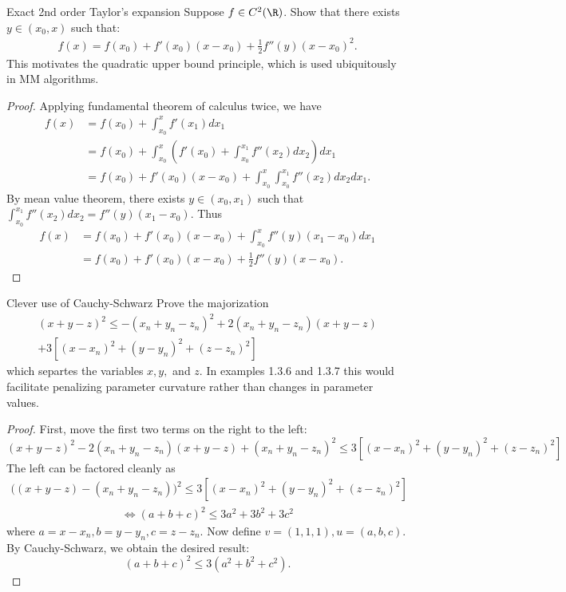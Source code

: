 \begin{problembox}{Exact 2nd order Taylor's expansion}{}
Suppose $f \in C^{2}(\R)$. Show that there exists $y \in (x_0, x)$ such that:
\begin{align*}
f(x) = f(x_0) + f'(x_0)(x - x_0) + \frac{1}{2} f''(y)(x - x_0)^2.
\end{align*}
This motivates the quadratic upper bound principle, which is used ubiquitously in MM algorithms.
\end{problembox}

\begin{proof}
Applying fundamental theorem of calculus twice, we have
\begin{align*}
	f(x) 
	&= f(x_0) + \int_{x_0}^x f'(x_1) dx_1\\
	&=f(x_0) + \int_{x_0}^x \left(f'(x_0) + \int_{x_0}^{x_1} f''(x_2)dx_2 \right)dx_1\\
	&= f(x_0) + f'(x_0)(x - x_0) + \int_{x_0}^x\int_{x_0}^{x_1}f''(x_2)dx_2dx_1.
\end{align*}
By mean value theorem, there exists $y \in (x_0, x_1)$ such that $\int_{x_0}^{x_1}f''(x_2)dx_2 = f''(y)(x_1 - x_0).$ Thus
\begin{align*}
	f(x)
	&= f(x_0) + f'(x_0)(x - x_0) +\int_{x_0}^x f''(y)(x_1 - x_0)dx_1\\
	&= f(x_0) + f'(x_0)(x - x_0) + \frac{1}{2}f''(y)(x - x_0).
\end{align*}
\end{proof}

\begin{problembox}{Clever use of Cauchy-Schwarz \hfill {\small \cite[Exercise 1.4.18]{lange2016mm}}}{}
Prove the majorization
\begin{equation*}
\begin{split}
(x + y - z)^2 \leq -(x_n + y_n - z_n)^2 + 2(x_n + y_n-z_n)(x+y-z) \\
+ 3[(x-x_n)^2 + (y-y_n)^2 + (z-z_n)^2]
\end{split}
\end{equation*}
which separtes the variables $x, y, $ and $z$. In examples 1.3.6 and 1.3.7 this would facilitate penalizing parameter curvature rather than changes in parameter values. 
\end{problembox}

\begin{proof}
First, move the first two terms on the right to the left: 
$$(x + y - z)^2 - 2(x_n + y_n-z_n)(x+y-z) + (x_n + y_n - z_n)^2 \leq 3[(x-x_n)^2 + (y-y_n)^2 + (z-z_n)^2]$$
The left can be factored cleanly as
\begin{align*}
\big( (x + y - z) - (x_n + y_n - z_n)\big)^2 \leq 3[(x-x_n)^2 + (y-y_n)^2 + (z-z_n)^2]
\end{align*}
\begin{align*}
\iff (a + b + c)^2 \leq 3a^2 + 3b^2 + 3c^2
\end{align*}
where $a = x - x_n, b = y - y_n, c = z - z_n.$ Now define $v = (1, 1, 1), u = (a, b, c).$ By Cauchy-Schwarz, we obtain the desired result:
$$(a + b + c)^2 \leq 3 (a^2 + b^2 + c^2).$$
\end{proof}
